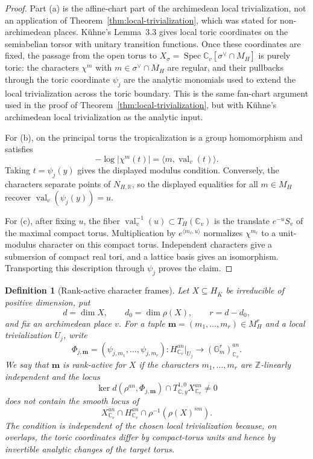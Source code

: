 \documentclass[10pt,a4paper]{amsart}
\theoremstyle{plain}
\newtheorem{definition}[theorem]{Definition}
\DeclareMathOperator{\val}{val}
\theoremstyle{plain}
\numberwithin{equation}{section}
\begin{document}
\begin{proof}
	Part (a) is the affine-chart part of the archimedean local trivialization,
	not an application of Theorem~\ref{thm:local-trivialization}, which was stated
	for non-archimedean places.  K\"uhne's Lemma~3.3 gives local toric coordinates
	on the semiabelian torsor with unitary transition functions.  Once these
	coordinates are fixed, the passage from the open torus to
	\(X_\sigma=\operatorname{Spec}\mathbb C_v[\sigma^\vee\cap M_H]\) is purely
	toric: the characters \(\chi^m\) with \(m\in\sigma^\vee\cap M_H\) are regular,
	and their pullbacks through the toric coordinate \(\psi_j\) are the analytic
	monomials used to extend the local trivialization across the toric boundary.
	This is the same fan-chart argument used in the proof of
	Theorem~\ref{thm:local-trivialization}, but with K\"uhne's archimedean local
	trivialization as the analytic input.
	
	For (b), on the principal torus the tropicalization is a group homomorphism and
	satisfies
	\[
	-\log|\chi^m(t)|=\langle m,\val_v(t)\rangle .
	\]
	Taking \(t=\psi_j(y)\) gives the displayed modulus condition.  Conversely, the
	characters separate points of \(N_{H,\mathbb R}\), so the displayed equalities
	for all \(m\in M_H\) recover \(\val_v(\psi_j(y))=u\).
	
	For (c), after fixing \(u\), the fiber
	\(\val_v^{-1}(u)\subset T_H(\mathbb C_v)\) is the translate
	\(e^{-u}S_v\) of the maximal compact torus.  Multiplication by
	\(e^{\langle m_\ell,u\rangle}\) normalizes \(\chi^{m_\ell}\) to a unit-modulus
	character on this compact torus.  Independent characters give a submersion of
	compact real tori, and a lattice basis gives an isomorphism.  Transporting this
	description through \(\psi_j\) proves the claim.
\end{proof}

\begin{definition}[Rank-active character frames]
	\label{def:rank-active-frame}
	Let \(X\subseteq H_{\overline K}\) be irreducible of positive dimension, put
	\[
	d=\dim X,\qquad d_0=\dim\rho(X),\qquad r=d-d_0,
	\]
	and fix an archimedean place \(v\).  For a tuple
	\(\mathbf m=(m_1,\ldots,m_r)\in M_H^r\) and a local trivialization \(U_j\),
	write
	\[
	\Phi_{j,\mathbf m}
	=
	(\psi_{j,m_1},\ldots,\psi_{j,m_r})
	:
	H^{an}_{\mathbb C_v}|_{U_j}\longrightarrow(\mathbb G_m^r)^{an}_{\mathbb C_v}.
	\]
	We say that \(\mathbf m\) is rank-active for \(X\) if the characters
	\(m_1,\ldots,m_r\) are \(\mathbb Z\)-linearly independent and the locus
	\[
	\ker d(\rho^{an},\Phi_{j,\mathbf m})\cap
	T^{1,0}_{\mathbb C,y}X^{an}_{\mathbb C_v}
	\neq 0
	\]
	does not contain the smooth locus of
	\[
	X^{an}_{\mathbb C_v}\cap H^{an}_{\mathbb C_v}\cap
	\rho^{-1}(\rho(X)^{sm}).
	\]
	The condition is independent of the chosen local trivialization because, on
	overlaps, the toric coordinates differ by compact-torus units and hence by
	invertible analytic changes of the target torus.
\end{definition}
\end{document}
